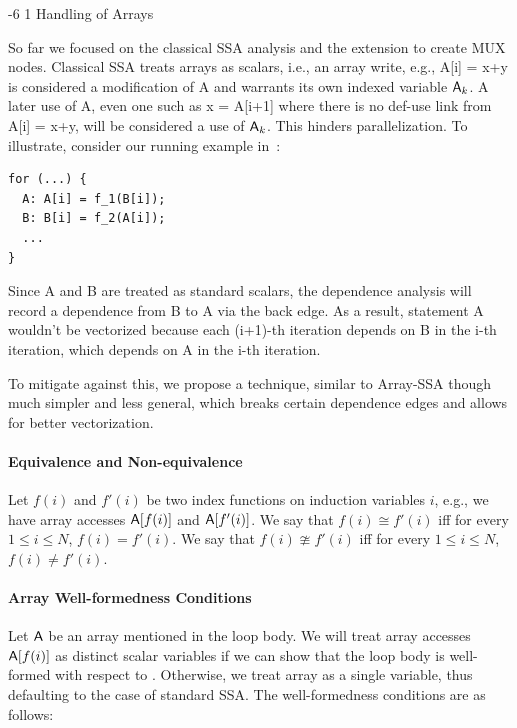 \documentclass[sigconf, screen, natbib=false, dvipsnames, table]{acmart}
\makeatletter
\renewcommand{\subsubsection}{\@startsection{subsubsection}{3}{\z@}%
                        {-6\p@ \@plus -4\p@ \@minus -4\p@}%
                        {1\p@ \@plus 1\p@ \@minus 0\p@}%
                        {\normalfont\normalsize\bfseries\boldmath}}
\theoremstyle{definition}
\makeatother
\begin{document}
\subsubsection{Handling of Arrays}
\label{???}

So far we focused on the classical SSA analysis and the extension to create MUX nodes. 
Classical SSA treats arrays as scalars, i.e., an array write, e.g., {\sf A[i] = x+y} is considered
a modification of {\sf A} and warrants its own indexed variable ${\sf A}_k$. A later use of {\sf A}, 
even one such as {\sf x = A[i+1]} where there is no def-use link from {\sf A[i] = x+y}, will be 
considered a use of ${\sf A}_k$. This hinders parallelization. To illustrate, consider our running
example in~:
\begin{verbatim}
for (...) {
  A: A[i] = f_1(B[i]);
  B: B[i] = f_2(A[i]);
  ...
}
\end{verbatim}
Since {\sf A} and {\sf B} are treated as standard scalars, the dependence analysis will record
a dependence from {\sf B} to {\sf A} via the back edge. As a result, statement {\sf A} wouldn't 
be vectorized because each (i+1)-th iteration depends on {\sf B} in the i-th iteration,
which depends on {\sf A} in the i-th iteration. 

To mitigate against this, we propose a technique, similar to Array-SSA though much simpler and 
less general, which breaks certain dependence edges and allows for better vectorization. 


\paragraph {Equivalence and Non-equivalence} Let $f(i)$ and $f'(i)$ be two index functions on induction variables $i$, 
e.g., we have array accesses ${{\sf A}}[f(i)]$ and ${{\sf A}}[f'(i)]$. We say that $f(i) \cong f'(i)$ iff for every $1 \le i \le N$,
$f(i) = f'(i)$. We say that $f(i) \ncong f'(i)$ iff for every $1 \le i \le N$, $f(i) \neq f'(i)$. 

\paragraph{Array Well-formedness Conditions} Let ${{\sf A}}$ be an array mentioned in the loop body. 
We will treat array accesses ${{\sf A}}[f(i)]$ as distinct scalar variables if we can show that the loop body is
well-formed with respect to \A. Otherwise, we treat array {\A} as a single variable, thus defaulting to the 
case of standard SSA. The well-formedness conditions are as follows: 
\end{document}
